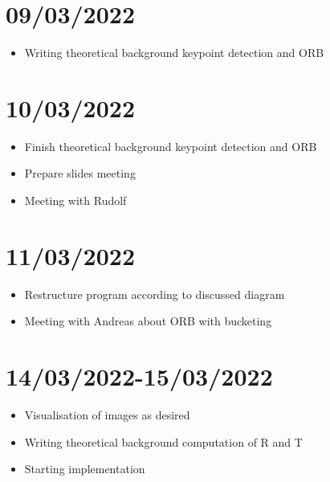 \section{09/03/2022}
\begin{itemize}
    \item Writing theoretical background keypoint detection and ORB
\end{itemize}

\section{10/03/2022}
\begin{itemize}
    \item Finish theoretical background keypoint detection and ORB
    \item Prepare slides meeting
    \item Meeting with Rudolf
\end{itemize}

\section{11/03/2022}
\begin{itemize}
    \item Restructure program according to discussed diagram
    \item Meeting with Andreas about ORB with bucketing
\end{itemize}

\section{14/03/2022-15/03/2022}
\begin{itemize}
    \item Visualisation of images as desired
    \item Writing theoretical background computation of R and T
    \item Starting implementation
\end{itemize}
